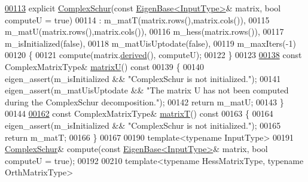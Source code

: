 \begin{DoxyCode}
\hyperlink{group___eigenvalues___module_a9c92c6e4c33890d2d063c5c8dd22777d}{00113}     \textcolor{keyword}{explicit} \hyperlink{group___eigenvalues___module_a9c92c6e4c33890d2d063c5c8dd22777d}{ComplexSchur}(\textcolor{keyword}{const} \hyperlink{group___core___module_struct_eigen_1_1_eigen_base}{EigenBase<InputType>}& matrix, \textcolor{keywordtype}{bool} computeU
       = \textcolor{keyword}{true})
00114       : m\_matT(matrix.rows(),matrix.cols()),
00115         m\_matU(matrix.rows(),matrix.cols()),
00116         m\_hess(matrix.rows()),
00117         m\_isInitialized(false),
00118         m\_matUisUptodate(false),
00119         m\_maxIters(-1)
00120     \{
00121       compute(matrix.\hyperlink{group___core___module_a324b16961a11d2ecfd2d1b7dd7946545}{derived}(), computeU);
00122     \}
00123 
\hyperlink{group___eigenvalues___module_afed8177cf9836f032d42bdb6c6bc6e01}{00138}     \textcolor{keyword}{const} ComplexMatrixType& \hyperlink{group___eigenvalues___module_afed8177cf9836f032d42bdb6c6bc6e01}{matrixU}()\textcolor{keyword}{ const}
00139 \textcolor{keyword}{    }\{
00140       eigen\_assert(m\_isInitialized && \textcolor{stringliteral}{"ComplexSchur is not initialized."});
00141       eigen\_assert(m\_matUisUptodate && \textcolor{stringliteral}{"The matrix U has not been computed during the ComplexSchur
       decomposition."});
00142       \textcolor{keywordflow}{return} m\_matU;
00143     \}
00144 
\hyperlink{group___eigenvalues___module_add3ab5ed83f7f2f06b79fa910a2d5684}{00162}     \textcolor{keyword}{const} ComplexMatrixType& \hyperlink{group___eigenvalues___module_add3ab5ed83f7f2f06b79fa910a2d5684}{matrixT}()\textcolor{keyword}{ const}
00163 \textcolor{keyword}{    }\{
00164       eigen\_assert(m\_isInitialized && \textcolor{stringliteral}{"ComplexSchur is not initialized."});
00165       \textcolor{keywordflow}{return} m\_matT;
00166     \}
00167 
00190     \textcolor{keyword}{template}<\textcolor{keyword}{typename} InputType>
00191     \hyperlink{group___eigenvalues___module_class_eigen_1_1_complex_schur}{ComplexSchur}& compute(\textcolor{keyword}{const} \hyperlink{group___core___module_struct_eigen_1_1_eigen_base}{EigenBase<InputType>}& matrix, \textcolor{keywordtype}{bool} computeU
       = \textcolor{keyword}{true});
00192     
00210     \textcolor{keyword}{template}<\textcolor{keyword}{typename} HessMatrixType, \textcolor{keyword}{typename} OrthMatrixType>

\end{DoxyCode}
